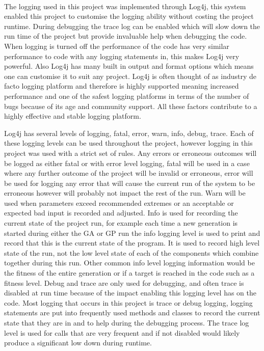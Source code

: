 \documentclass[12pt]{article}
\begin{document}
\paragraph{}

The logging used in this project was implemented through Log4j, this system enabled this project to customise the logging 
ability without costing the project runtime. During debugging the trace log can be enabled which will slow down the
run time of the project but provide invaluable help when debugging the code. When logging is turned off the performance
of the code has very similar performance to code with any logging statements in, this makes Log4j very powerful. Also
Log4j has many built in output and format options which means one can customise it to suit any project. Log4j is often
thought of as industry de facto logging platform and therefore is highly supported meaning increased performance
and one of the safest logging platforms in terms of the number of bugs because of its age and community support. All these
factors contribute to a highly effective and stable logging platform. 

Log4j has several levels of logging, fatal, error, warn, info, debug, trace. Each of these logging levels can be used throughout
the project, however logging in this project was used with a strict set of rules. Any errors or erroneous outcomes will 
be logged as either fatal or with error level logging, fatal will be used in a case where any further outcome of the project
will be invalid or erroneous, error will be used for logging any error that will cause the current run of the system to be
erroneous however will probably not impact the rest of the run. Warn will be used when parameters exceed recommended
extremes or an acceptable or expected bad input is recorded and adjusted. Info is used for recording the current state of
the project run, for example each time a new generation is started during either the GA or GP run the info logging level is
used to print and record that this is the current state of the program. It is used to record high level state of the run,
not the low level state of each of the components which combine together during this run. Other common info level logging
information would be the fitness of the entire generation or if a target is reached in the code such as a fitness level.
Debug and trace are only used for debugging, and often trace is disabled at run time because of the impact enabling this
logging level has on the code. Most logging that occurs in this project is trace or debug logging, logging statements are
put into frequently used methods and classes to record the current state that they are in and to help during the debugging
process. The trace log level is used for calls that are very frequent and if not disabled would likely produce a significant
low down during runtime. 
\end{document}

